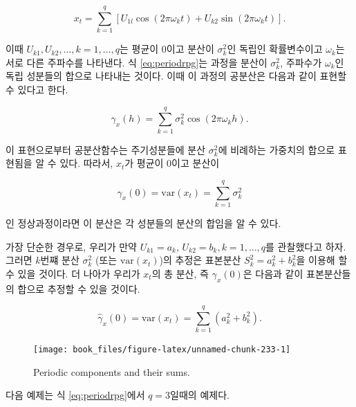 \documentclass[b5paper,]{scrbook}
\theoremstyle{plain}
\theoremstyle{definition}
\numberwithin{equation}{section}
\begin{document}
\begin{equation}
x_{t}=\sum_{k=1}^{q}[U_{1l}\cos(2\pi\omega_{k} t) + U_{k2}\sin(2\pi\omega_{k} t)].
\label{eq:periodrpg}
\end{equation}

이때 \(U_{k1},U_{k2},\ldots, k=1,\ldots, q\)는 평균이 0이고 분산이 \(\sigma_{k}^{2}\)인 독립인 확률변수이고 \(\omega_{k}\)는 서로 다른 주파수를 나타낸다. 식 \eqref{eq:periodrpg}는 과정을 분산이 \(\sigma_{k}^{2}\), 주파수가 \(\omega_{k}\)인 독립 성분들의 합으로 나타내는 것이다. 이때 이 과정의 공분산은 다음과 같이 표현할 수 있다고 한다.

\begin{equation}
\gamma_{x}(h)=\sum_{k=1}^{q}\sigma_{k}^{2}\cos(2\pi \omega_{k}h).
\label{eq:periodrpautocov}
\end{equation}

이 표현으로부터 공분산함수는 주기성분들에 분산 \(\sigma_{k}^{2}\)에 비례하는 가중치의 합으로 표현됨을 알 수 있다. 따라서, \(x_{t}\)가 평균이 0이고 분산이

\begin{equation}
\gamma_{x}(0)=\text{var}(x_{t})=\sum_{k=1}^{q}\sigma_{k}^{2}
\label{eq:periodrpvar}
\end{equation}

인 정상과정이라면 이 분산은 각 성분들의 분산의 합임을 알 수 있다.

가장 단순한 경우로, 우리가 만약 \(U_{k1}=a_{k}\), \(U_{k2}=b_{k}, k=1,\ldots, q\)를 관찰했다고 하자. 그러면 \(k\)번쨰 분산 \(\sigma_{k}^{2}\) (또는 \(\text{var}(x_{t})\))의 추정은 표본분산 \(S_{k}^{2}=a_{k}^{2}+b_{k}^{2}\)을 이용해 할 수 있을 것이다. 더 나아가 우리가 \(x_{t}\)의 총 분산, 즉 \(\gamma_{x}(0)\)은 다음과 같이 표본분산들의 합으로 추정할 수 있을 것이다.

\begin{equation}
\hat{\gamma}_{x}(0)=\text{var}(x_{t})=\sum_{k=1}^{q}(a_{k}^{2}+b_{k}^{2}).
\label{eq:periodrpvarest}
\end{equation}

\begin{figure}

{\centering \texttt{[image: book\_files/figure-latex/unnamed-chunk-233-1]} 

}

\caption{Periodic components and their sums.}\label{fig:unnamed-chunk-233}
\end{figure}

다음 예제는 식 \eqref{eq:periodrpg}에서 \(q=3\)일때의 예제다.
\end{document}
